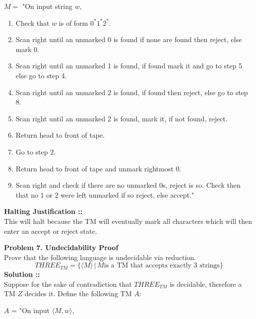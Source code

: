 \documentclass[11pt]{article}
\begin{document}
$M =$ "On input string $w$,
\begin{enumerate}[\hspace{20px}1.]
\item
Check that $w$ is of form $0^*1^*2^*$.

\item
Scan right until an unmarked 0 is found if none are found then reject,
else mark 0.

\item Scan right until an unmarked 1 is found, if found mark it and go to
step 5 else go to step 4.

\item 
Scan right until an unmarked 2 is found, if found then reject, else go to
step 8.

\item 
Scan right until an unmarked 2 is found, mark it, if not found, reject.

\item 
Return head to front of tape.

\item
Go to step 2.

\item
Return head to front of tape and unmark rightmost 0.

\item Scan right and check if there are no unmarked 0s, reject is so. Check
then that no 1 or 2 were left unmarked if so reject, else accept."
\end{enumerate}

\textbf{Halting Justification ::} \\
This will halt because the TM will eventually mark all characters which will
then enter an accept or reject state.
\pagebreak


\textbf{Problem 7. Undecidability Proof} \\
Prove that the following language is undecidable via reduction.
$$THREE_{TM} = \{\langle M\rangle\,|\, M
\text{is a TM that accepts exactly 3 strings}\}$$
\vspace{5px}\textbf{Solution ::} \\
Suppose for the sake of contradiction that $THREE_{TM}$ is decidable, therefore
a TM $Z$ decides it. Define the following TM $A$:

\vspace{5px}$A$ = "On input $\langle M, w\rangle$,
\end{document}
